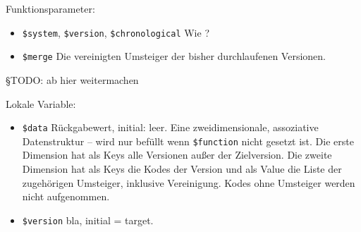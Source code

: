 

Funktionsparameter:

\begin{itemize}
\item \texttt{\$system}, \texttt{\$version}, \texttt{\$chronological} \newline Wie ?  
\item \texttt{\$merge} \newline Die vereinigten Umsteiger der bisher durchlaufenen Versionen. 
\end{itemize}

{\color{blue} §TODO: ab hier weitermachen}

Lokale Variable:

\begin{itemize}
\item \texttt{\$data} \hspace{2em} Rückgabewert, initial: leer.
\newline Eine zweidimensionale, assoziative Datenstruktur -- wird nur befüllt wenn \texttt{\$function} nicht gesetzt ist. Die erste Dimension hat als Keys alle Versionen außer der Zielversion. Die zweite Dimension hat als Keys die Kodes der Version und als Value die Liste der zugehörigen Umsteiger, inklusive Vereinigung. Kodes ohne Umsteiger werden nicht aufgenommen.
\item \texttt{\$version} \newline bla, initial = target.
\end{itemize}

